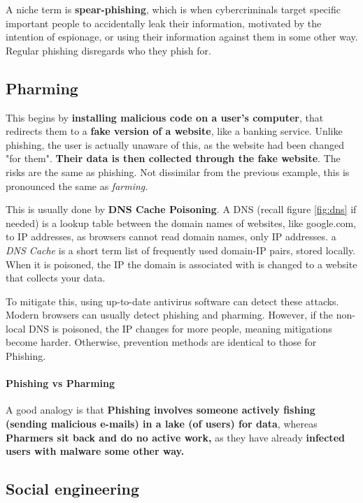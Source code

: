 \documentclass[../main.tex]{subfiles}
\begin{document}
A niche term is \textbf{spear-phishing}, which is when cybercriminals target specific important people to accidentally leak their information, motivated by the intention of espionage, or using their information against them in some other way. Regular phishing disregards who they phish for.

\subsection{Pharming}

This begins by \textbf{installing malicious code on a user's computer}, that redirects them to a \textbf{fake version of a website}, like a banking service. Unlike phishing, the user is actually unaware of this, as the website had been changed "for them". \textbf{Their data is then collected through the fake website}. The risks are the same as phishing. Not dissimilar from the previous example, this is pronounced the same as \emph{farming.}

This is usually done by \textbf{DNS Cache Poisoning}. A DNS (recall figure \ref{fig:dns} if needed) is a lookup table between the domain names of websites, like {\mono google.com}, to IP addresses, as browsers cannot read domain names, only IP addresses. a \emph{DNS Cache} is a short term list of frequently used domain-IP pairs, stored locally. When it is poisoned, the IP the domain is associated with is changed to a website that collects your data.

To mitigate this, using up-to-date antivirus software can detect these attacks. Modern browsers can usually detect phishing and pharming. However, if the non-local DNS is poisoned, the IP changes for more people, meaning mitigations become harder. Otherwise, prevention methods are identical to those for Phishing.

\paragraph{Phishing vs Pharming}

A good analogy is that \textbf{Phishing involves someone actively fishing (sending malicious e-mails) in a lake (of users) for data}, whereas \textbf{Pharmers sit back and do no active work,} as they have already \textbf{infected users with malware some other way.}

\subsection{Social engineering}
\end{document}
